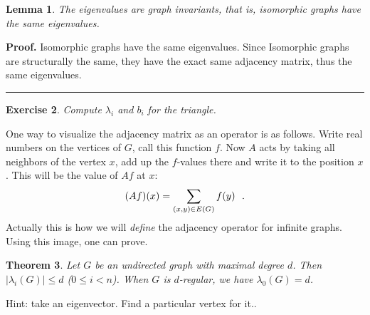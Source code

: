 \documentclass[12pt]{article}
\newtheorem{theorem}{Theorem}
\newtheorem{exercise}[theorem]{Exercise}
\newtheorem{lemma}[theorem]{Lemma}
\newenvironment{proof}[1][Proof]{\textbf{#1.} }{\ \rule{0.5em}{0.5em}}
\begin{document}
\begin{lemma}
The eigenvalues are graph invariants, that is, isomorphic graphs have the
same eigenvalues.
\end{lemma}
\begin{proof}
    Isomorphic graphs have the same eigenvalues. Since 
    Isomorphic graphs are structurally the same, 
    they have the exact same adjacency matrix, 
    thus the same eigenvalues.
\end{proof}


\begin{exercise}
Compute $\lambda_{i}$ and $b_{i}$ for the triangle.
\end{exercise}

One way to visualize the adjacency matrix as an operator is as follows.
Write real numbers on the vertices of $G$, call this function $f$. Now $A$
acts by taking all neighbors of the vertex $x$, add up the $f$-values there
and write it to the position $x$. This will be the value of $Af$ at $x$: 
\begin{equation*}
(Af)(x)=\dsum \limits_{(x,y)\in E(G)}f(y)\text{.}
\end{equation*}
Actually this is how we will \emph{define} the adjacency operator for
infinite graphs. Using this image, one can prove.

\begin{theorem}
Let $G$ be an undirected graph with maximal degree $d$. Then $\left\vert
\lambda_{i}(G)\right\vert \leq d$ ($0\leq i<n$). When $G$ is $d$-regular, we
have $\lambda_{0}(G)=d$.
\end{theorem}

Hint: take an eigenvector. Find a particular vertex for it..
\end{document}
